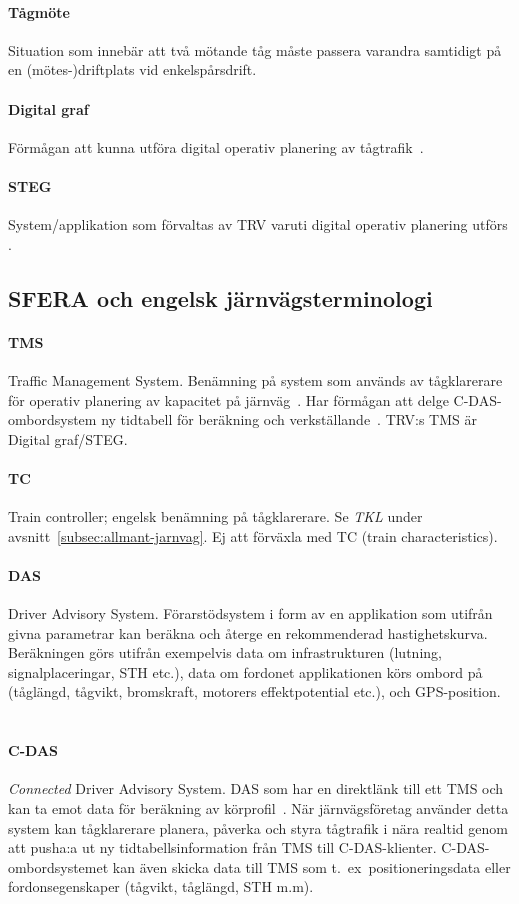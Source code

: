 \paragraph{Tågmöte}
Situation som innebär att två mötande tåg måste passera varandra samtidigt på en (mötes-)driftplats vid enkelspårsdrift.
\paragraph{Digital graf}
Förmågan att kunna utföra digital operativ planering av tågtrafik~\cite{Systemdefinition2019}.
\paragraph{STEG}
System/applikation som förvaltas av TRV varuti digital operativ planering utförs\\\cite{Systemdefinition2019}.
\subsection{SFERA och engelsk järnvägsterminologi}\label{subsec:sfera-och-engelsk-terminologi}

\paragraph{TMS}
Traffic Management System.
Benämning på system som används av tågklarerare för operativ planering av kapacitet på järnväg~\cite{Joborn2023}.
Har förmågan att delge C-DAS-ombordsystem ny tidtabell för beräkning och verkställande~\cite{Joborn2023}.
TRV:s TMS är Digital graf/STEG\@.
\paragraph{TC}
Train controller; engelsk benämning på tågklarerare.
Se \emph{TKL} under avsnitt~\ref{subsec:allmant-jarnvag}.
Ej att förväxla med TC (train characteristics).
\paragraph{DAS}
Driver Advisory System.
Förarstödsystem i form av en applikation som utifrån givna parametrar kan beräkna och återge en rekommenderad hastighetskurva.
Beräkningen görs utifrån exempelvis data om infrastrukturen (lutning, signalplaceringar, STH etc.), data om fordonet applikationen körs ombord på (tåglängd, tågvikt, bromskraft, motorers effektpotential etc.), och GPS-position.
~\cite{Yao2022}
\paragraph{C-DAS}
\emph{Connected} Driver Advisory System.
DAS som har en direktlänk till ett TMS och kan ta emot data för beräkning av körprofil~\cite{Olsson2023}.
När järnvägsföretag använder detta system kan tågklarerare planera, påverka och styra tågtrafik i nära realtid genom att pusha:a ut ny tidtabellsinformation från TMS till C-DAS-klienter.
C-DAS-ombordsystemet kan även skicka data till TMS som t.~ex~positioneringsdata eller fordonsegenskaper (tågvikt, tåglängd, STH m.m).
